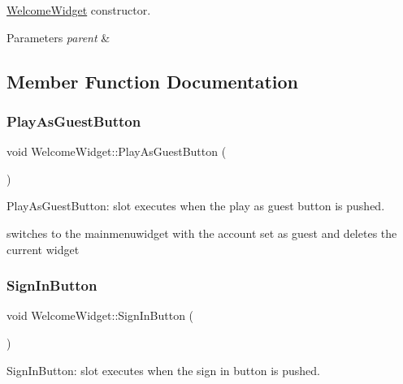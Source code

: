 \hyperlink{classWelcomeWidget}{Welcome\+Widget} constructor. 


\begin{DoxyParams}{Parameters}
{\em parent} & \\
\hline
\end{DoxyParams}


\subsection{Member Function Documentation}
\mbox{\label{classWelcomeWidget_adf8132423915c0d69ac51c9cb4cec04b}} 
\subsubsection{\texorpdfstring{Play\+As\+Guest\+Button}{PlayAsGuestButton}}
{\footnotesize\ttfamily void Welcome\+Widget\+::\+Play\+As\+Guest\+Button (\begin{DoxyParamCaption}{ }\end{DoxyParamCaption})\hspace{0.3cm}{\ttfamily [slot]}}



Play\+As\+Guest\+Button\+: slot executes when the play as guest button is pushed. 

switches to the mainmenuwidget with the account set as guest and deletes the current widget \mbox{\label{classWelcomeWidget_abd744cc72e89fc94825bcbce670181d0}} 
\subsubsection{\texorpdfstring{Sign\+In\+Button}{SignInButton}}
{\footnotesize\ttfamily void Welcome\+Widget\+::\+Sign\+In\+Button (\begin{DoxyParamCaption}{ }\end{DoxyParamCaption})\hspace{0.3cm}{\ttfamily [slot]}}



Sign\+In\+Button\+: slot executes when the sign in button is pushed. 

